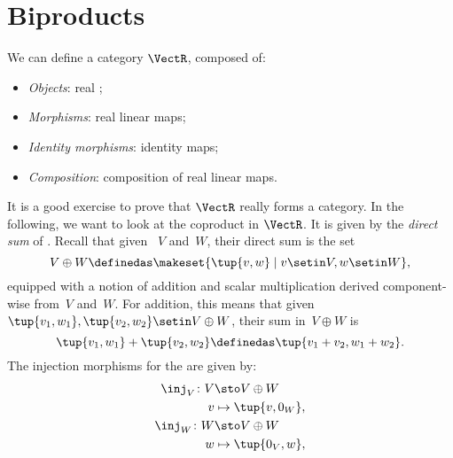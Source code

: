 
\section{Biproducts}

\publictodomessage


\begin{example}
    We can define a category $\VectR$, composed of: %
    \begin{itemize}
        \item \emph{Objects}: real ;
        \item \emph{Morphisms}: real linear maps;
        \item \emph{Identity morphisms}: identity maps;
        \item \emph{Composition}: composition of real linear maps.
    \end{itemize}
    It is a good exercise to prove that $\VectR$ really forms a category.
    In the following, we want to look at the coproduct in $\VectR$.
    It is given by the \emph{direct sum} of .
    Recall that given ~$V$ and~$W$, their direct sum is the set
    \begin{equation}
        V\oplus W\definedas \makeset{\tup{v,w}\mid v\setin V,w\setin W},
    \end{equation}
    equipped with a notion of addition and scalar multiplication derived component-wise from~$V$ and~$W$.
    For addition, this means that given~$\tup{v_1,w_1}, \tup{v_2,w_2}\setin V\oplus W$, their sum in~$V \oplus W$ is
    \begin{equation}
        \tup{v_1,w_1}+\tup{v_2,w_2}\definedas \tup{v_1+v_2,w_1+w_2}.
    \end{equation}
    The injection morphisms for the  are given by:
    \begin{equation}
        \begin{aligned}
            \inj_V \colon V & \sto V\oplus W \\
            v               & \mapsto \tup{v,0_W}, \\
            \inj_W \colon W & \sto V\oplus W \\
            w               & \mapsto \tup{0_V,w},
        \end{aligned}

\end{equation}
\end{example}
